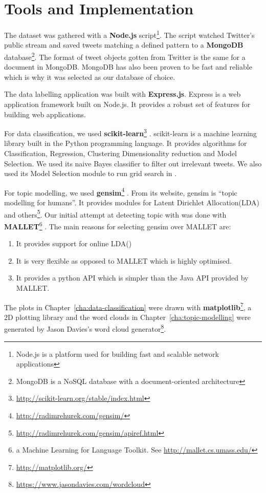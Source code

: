 \chapter{Tools and Implementation}
\label{cha:tools-and-implementation}

The dataset was gathered with a \textbf{Node.js} script\footnote{Node.js is a platform used for
building fast and scalable network applications}. The script watched Twitter's public stream and
saved tweets matching a defined pattern to a \textbf{MongoDB} database\footnote{MongoDB is a NoSQL
database with a document-oriented architecture}. The format of tweet objects gotten from Twitter
is the same for a document in MongoDB\@. MongoDB has also been proven to be fast and reliable
which is why it was selected as our database of choice.

The data labelling application was built with \textbf{Express.js}. Express is a web application
framework built on Node.js. It provides a robust set of features for building web applications.

For data classification, we used
\textbf{scikit-learn}\footnote{\url{http://scikit-learn.org/stable/index.html}} \citep{scikit-learn}.
scikit-learn is a machine learning library built in the Python programming language. It provides
algorithms for Classification, Regression, Clustering Dimensionality reduction and Model Selection.
We used its naive Bayes classifier to filter out irrelevant tweets. We also used its Model Selection
module to run grid search in .

For topic modelling, we used \textbf{gensim}\footnote{\url{http://radimrehurek.com/gensim/}}
\citep{rehurek_lrec}. From its website, gensim is ``topic modelling for humans''. It provides
modules for Latent Dirichlet Allocation(LDA) and
others\footnote{\url{http://radimrehurek.com/gensim/apiref.html}}. Our initial attempt at detecting
topic with was done with \textbf{MALLET}\footnote{a Machine Learning for Language Toolkit. See
\url{http://mallet.cs.umass.edu/}} \citep{McCallumMALLET}. The main reasons for selecting gensim
over MALLET are:
\begin{enumerate}
  \item It provides support for online LDA()
  \item It is very flexible as opposed to MALLET which is highly optimised.
  \item It provides a python API which is simpler than the Java API provided by MALLET.
\end{enumerate}

The plots in Chapter~\ref{cha:data-classification} were drawn with
\textbf{matplotlib}\footnote{\url{http://matplotlib.org/}}, a 2D plotting library \citep{hunter-2007} and the
word clouds in Chapter~\ref{cha:topic-modelling} were generated by Jason Davies's word cloud
generator\footnote{\url{https://www.jasondavies.com/wordcloud}}.


